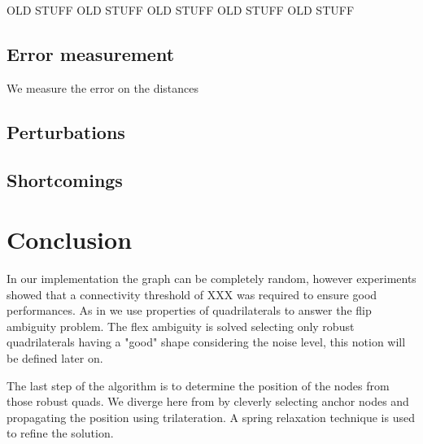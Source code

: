 \documentclass[letterpaper, 10 pt, conference]{ieeeconf}  %
\begin{document}
OLD STUFF
OLD STUFF
OLD STUFF
OLD STUFF
OLD STUFF














\subsection{Error measurement}
We measure the error on the distances 




\subsection{Perturbations}

\subsection{Shortcomings}
%

\section{Conclusion}











In our implementation the graph can be completely random, however experiments showed that a connectivity threshold of XXX was required to ensure good performances. As in \cite{MooreTeller} we use properties of quadrilaterals to answer the flip ambiguity problem. The flex ambiguity is solved selecting only robust quadrilaterals having a "good" shape considering the noise level, this notion will be defined later on. 

The last step of the algorithm is to determine the position of the nodes from those robust quads. We diverge here from \cite{MooreTeller} by cleverly selecting anchor nodes and propagating the position using trilateration. A spring relaxation technique is used to refine the solution. 
\end{document}
